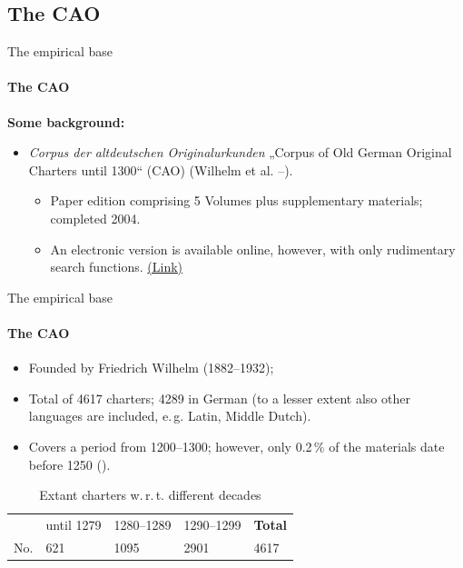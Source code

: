 \documentclass[xcolor=table, compress, %
handout
]{beamer}
\newcommand{\qu}[1]{„#1“}
\begin{document}
\subsection{The CAO}


\begin{frame}{The empirical base}
\framesubtitle{The CAO}

\textbf{Some background:}

\begin{itemize}
\item \textit{Corpus der altdeutschen Originalurkunden} \qu{Corpus of Old German Original Charters until 1300} (CAO) (Wilhelm et al. \citeyear{cao1}–\citeyear{cao5}).
\begin{itemize}
\item Paper edition comprising 5 Volumes plus supplementary materials; completed 2004.
\item An electronic version is available online, however, with only rudimentary search functions. \href{http://tcdh01.uni-trier.de/cgi-bin/iCorpus/CorpusIndex.tcl}{\alert{\tiny{(Link)}}}
\end{itemize}
\end{itemize}

\end{frame}



\begin{frame}{The empirical base}
\framesubtitle{The CAO}


\begin{itemize}
\item Founded by Friedrich Wilhelm (1882–1932);
\item Total of 4617 charters; 4289 in German (to a lesser extent also other languages are included, e.\,g. Latin, Middle Dutch).
\item Covers a period from 1200–1300; however, only 0.2\,\% of the materials date before 1250 (\citealt[42]{ganslmayer09}).
\end{itemize}

\begin{table}
\begin{center}
\begin{tabular}{lllll}
\toprule
& until 1279 & 1280–1289 & 1290–1299 & \textbf{Total}\\ 
\cmidrule{1-5}
No. & 621 & 1095 & 2901 & 4617\\
\bottomrule
\end{tabular}
\caption{Extant charters w.\,r.\,t. different decades}
\end{center}
\end{table}

\end{frame}
\end{document}
